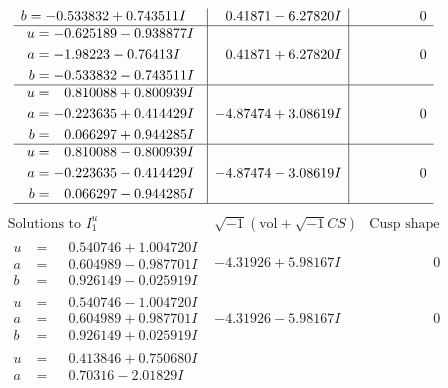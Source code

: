 \documentclass[1p]{elsarticle_modified}
\theoremstyle{definition}
\newcommand{\I}{\sqrt{-1}}
\begin{document}
$$\begin{array}{c|c|c}
\begin{aligned}
b &= -0.533832 + 0.743511 I\end{aligned}
 & \phantom{-}0.41871 - 6.27820 I & \phantom{-0.000000 } 0 \\ \hline\begin{aligned}
u &= -0.625189 - 0.938877 I \\
a &= -1.98223 - 0.76413 I \\
b &= -0.533832 - 0.743511 I\end{aligned}
 & \phantom{-}0.41871 + 6.27820 I & \phantom{-0.000000 } 0 \\ \hline\begin{aligned}
u &= \phantom{-}0.810088 + 0.800939 I \\
a &= -0.223635 + 0.414429 I \\
b &= \phantom{-}0.066297 + 0.944285 I\end{aligned}
 & -4.87474 + 3.08619 I & \phantom{-0.000000 } 0 \\ \hline\begin{aligned}
u &= \phantom{-}0.810088 - 0.800939 I \\
a &= -0.223635 - 0.414429 I \\
b &= \phantom{-}0.066297 - 0.944285 I\end{aligned}
 & -4.87474 - 3.08619 I & \phantom{-0.000000 } 0\\
 \hline 
 \end{array}$$\newpage$$\begin{array}{c|c|c}  
\text{Solutions to }I^u_{1}& \I (\text{vol} + \sqrt{-1}CS) & \text{Cusp shape}\\
 \hline 
\begin{aligned}
u &= \phantom{-}0.540746 + 1.004720 I \\
a &= \phantom{-}0.604989 - 0.987701 I \\
b &= \phantom{-}0.926149 - 0.025919 I\end{aligned}
 & -4.31926 + 5.98167 I & \phantom{-0.000000 } 0 \\ \hline\begin{aligned}
u &= \phantom{-}0.540746 - 1.004720 I \\
a &= \phantom{-}0.604989 + 0.987701 I \\
b &= \phantom{-}0.926149 + 0.025919 I\end{aligned}
 & -4.31926 - 5.98167 I & \phantom{-0.000000 } 0 \\ \hline\begin{aligned}
u &= \phantom{-}0.413846 + 0.750680 I \\
a &= \phantom{-}0.70316 - 2.01829 I \\

\end{aligned}
\end{array}$$
\end{document}
